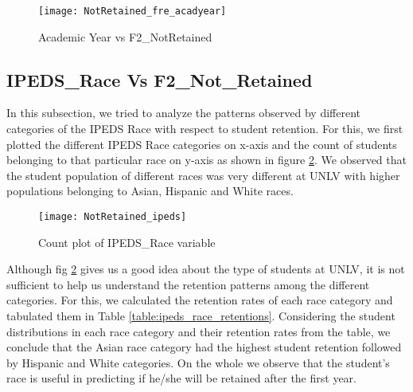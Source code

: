 \documentclass[11pt,openright]{report}
\begin{document}
\begin{figure}[!htb]
	\centering
	\texttt{[image: NotRetained\_fre\_acadyear]}
	\caption{Academic Year vs F2\_NotRetained}
	\label{fig:AcadYear_F2NotRetained_plot}
\end{figure}


\subsection {IPEDS\_Race Vs F2\_Not\_Retained}
In this subsection, we tried to analyze the patterns observed by different categories of the IPEDS Race with respect to student retention. For this, we first plotted the different IPEDS Race categories on x-axis and the count of students belonging to that particular race on y-axis as shown in figure \ref{fig:ipeds_F2NotRetained_plot}. We observed that the student population of different races was very different at UNLV with higher populations belonging to Asian, Hispanic and White races.


\begin{figure}[!htb]
	\centering
	\texttt{[image: NotRetained\_ipeds]}
	\caption{Count plot of IPEDS\_Race variable}
	\label{fig:ipeds_F2NotRetained_plot}
\end{figure}



Although fig \ref{fig:ipeds_F2NotRetained_plot} gives us a good idea about the type of students at UNLV, it is not sufficient to help us understand the retention patterns among the different categories. For this, we calculated the retention rates of each race category and tabulated them in Table \ref{table:ipeds_race_retentions}. Considering the student distributions in each race category and their retention rates from the table, we conclude that the Asian race category had the highest student retention followed by Hispanic and White categories. On the whole we observe that the student's race is useful in predicting if he/she will be retained after the first year.
\end{document}
